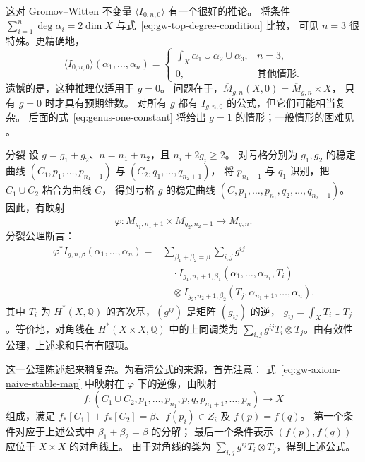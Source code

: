 这对 Gromov--Witten 不变量 $\langle I_{0,n,0}\rangle$ 有一个很好的推论。
将条件 $\sum_{i=1}^n\deg\alpha_i=2\dim X$ 与式~\eqref{eq:gw-top-degree-condition} 比较，
可见 $n=3$ 很特殊。更精确地，
\begin{equation}\label{eq:gw-degree-zero-three-point}
\langle I_{0,n,0}\rangle(\alpha_1,\ldots,\alpha_n)
=\begin{cases}
\displaystyle\int_X\alpha_1\cup\alpha_2\cup\alpha_3,&n=3,\\
0,&\text{其他情形}.
\end{cases}
\end{equation}
遗憾的是，这种推理仅适用于 $g=0$。
问题在于，$\overline M_{g,n}(X,0)=\overline M_{g,n}\times X$，
只有 $g=0$ 时才具有预期维数。
对所有 $g$ 都有 $I_{g,n,0}$ 的公式，但它们可能相当复杂。
后面的式~\eqref{eq:genus-one-constant} 将给出 $g=1$ 的情形；一般情形的困难见 。

\begin{axiom*}{分裂}
设 $g=g_1+g_2$、$n=n_1+n_2$，且 $n_i+2g_i\geq2$。
对亏格分别为 $g_1,g_2$ 的稳定曲线
$(C_1,p_1,\ldots,p_{n_1+1})$ 与 $(C_2,q_1,\ldots,q_{n_2+1})$，
将 $p_{n_1+1}$ 与 $q_1$ 识别，把 $C_1\cup C_2$ 粘合为曲线 $C$，
得到亏格 $g$ 的稳定曲线 $(C,p_1,\ldots,p_{n_1},q_2,\ldots,q_{n_2+1})$。
因此，有映射
\begin{equation}\label{eq:gw-splitting-gluing-map}
\varphi:\overline M_{g_1,n_1+1}\times\overline M_{g_2,n_2+1}
\longrightarrow\overline M_{g,n}.
\end{equation}
分裂公理断言：
\[
\begin{aligned}
\varphi^*I_{g,n,\beta}(\alpha_1,\ldots,\alpha_n)
={}&\sum_{\beta_1+\beta_2=\beta}\sum_{i,j}g^{ij}\\
&\quad\cdot I_{g_1,n_1+1,\beta_1}(\alpha_1,\ldots,\alpha_{n_1},T_i)\\
&\quad\otimes I_{g_2,n_2+1,\beta_2}(T_j,\alpha_{n_1+1},\ldots,\alpha_n).
\end{aligned}
\]
其中 $T_i$ 为 $H^*(X,\mathbb Q)$ 的齐次基，$(g^{ij})$ 是矩阵 $(g_{ij})$ 的逆，
$g_{ij}=\int_XT_i\cup T_j$。等价地，对角线在 $H^*(X\times X,\mathbb Q)$ 中的上同调类为
$\sum_{i,j}g^{ij}T_i\otimes T_j$。由有效性公理，上述求和只有有限项。
\end{axiom*}
这一公理陈述起来稍复杂。为看清公式的来源，首先注意：
式~\eqref{eq:gw-axiom-naive-stable-map} 中映射在 $\varphi$ 下的逆像，由映射
\[
f:(C_1\cup C_2,p_1,\ldots,p_{n_1},p,q,p_{n_1+1},\ldots,p_n)\longrightarrow X
\]
组成，满足 $f_*[C_1]+f_*[C_2]=\beta$、$f(p_i)\in Z_i$ 及 $f(p)=f(q)$。
第一个条件对应于上述公式中 $\beta_1+\beta_2=\beta$ 的分解；
最后一个条件表示 $(f(p),f(q))$ 应位于 $X\times X$ 的对角线上。
由于对角线的类为 $\sum_{i,j}g^{ij}T_i\otimes T_j$，得到上述公式。

